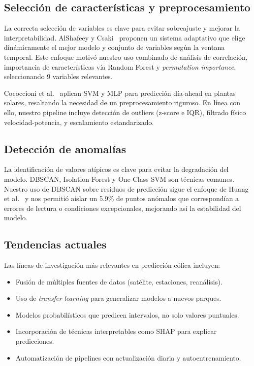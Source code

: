 \documentclass[conference]{IEEEtran}
\begin{document}
\subsection{Selección de características y preprocesamiento}
	
La correcta selección de variables es clave para evitar sobreajuste y mejorar la interpretabilidad. AlShafeey y Csaki~\cite{alshafeey2024adaptive} proponen un sistema adaptativo que elige dinámicamente el mejor modelo y conjunto de variables según la ventana temporal. Este enfoque motivó nuestro uso combinado de análisis de correlación, importancia de características vía Random Forest y \textit{permutation importance}, seleccionando 9 variables relevantes.
	
Cococcioni et al.~\cite{cococcioni2012oneday} aplican SVM y MLP para predicción día-ahead en plantas solares, resaltando la necesidad de un preprocesamiento riguroso. En línea con ello, nuestro pipeline incluye detección de outliers (z-score e IQR), filtrado físico velocidad-potencia, y escalamiento estandarizado.
	
\subsection{Detección de anomalías}
	
La identificación de valores atípicos es clave para evitar la degradación del modelo. DBSCAN, Isolation Forest y One-Class SVM son técnicas comunes. Nuestro uso de DBSCAN sobre residuos de predicción sigue el enfoque de Huang et al.~\cite{huang2023ensemble} y nos permitió aislar un 5.9\% de puntos anómalos que correspondían a errores de lectura o condiciones excepcionales, mejorando así la estabilidad del modelo.
	
\subsection{Tendencias actuales}
	
Las líneas de investigación más relevantes en predicción eólica incluyen:
	
\begin{itemize}

\item Fusión de múltiples fuentes de datos (satélite, estaciones, reanálisis).

\item Uso de \textit{transfer learning} para generalizar modelos a nuevos parques.

\item Modelos probabilísticos que predicen intervalos, no solo valores puntuales.

\item Incorporación de técnicas interpretables como SHAP para explicar predicciones.

\item Automatización de pipelines con actualización diaria y autoentrenamiento.
\end{itemize}
	
\end{document}
